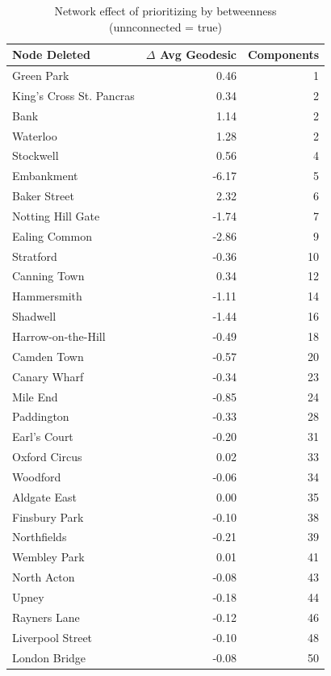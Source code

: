 \documentclass[11pt]{article} %
\begin{document}

\begin{table}[htbp]
\centering
\begin{tabular}{|l|r|r|}
\hline
Node Deleted & \multicolumn{1}{l|}{$\Delta$ Avg Geodesic} & \multicolumn{1}{l|}{Components} \\ \hline
Green Park & 0.46 & 1 \\ 
King's Cross St. Pancras & 0.34 & 2 \\ 
Bank & 1.14 & 2 \\ 
Waterloo & 1.28 & 2 \\ 
Stockwell & 0.56 & 4 \\ 
Embankment & -6.17 & 5 \\ 
Baker Street & 2.32 & 6 \\ 
Notting Hill Gate & -1.74 & 7 \\ 
Ealing Common & -2.86 & 9 \\ 
Stratford & -0.36 & 10 \\ 
Canning Town & 0.34 & 12 \\ 
Hammersmith & -1.11 & 14 \\ 
Shadwell & -1.44 & 16 \\ 
Harrow-on-the-Hill & -0.49 & 18 \\ 
Camden Town & -0.57 & 20 \\ 
Canary Wharf & -0.34 & 23 \\ 
Mile End & -0.85 & 24 \\ 
Paddington & -0.33 & 28 \\ 
Earl's Court & -0.20 & 31 \\ 
Oxford Circus & 0.02 & 33 \\ 
Woodford & -0.06 & 34 \\ 
Aldgate East & 0.00 & 35 \\ 
Finsbury Park & -0.10 & 38 \\ 
Northfields & -0.21 & 39 \\ 
Wembley Park & 0.01 & 41 \\ 
North Acton & -0.08 & 43 \\ 
Upney & -0.18 & 44 \\ 
Rayners Lane & -0.12 & 46 \\ 
Liverpool Street & -0.10 & 48 \\ 
London Bridge & -0.08 & 50 \\ \hline
\end{tabular}
\caption{Network effect of prioritizing by betweenness \\ (unnconnected = true)}
\label{betweenness true}
\end{table}
\end{document}
